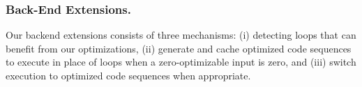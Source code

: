 

 
 
 \subsubsection{Back-End Extensions.}
 Our backend extensions consists of three mechanisms: (i) detecting loops that can benefit from our optimizations, (ii) generate and cache optimized code sequences to execute in place of loops when a zero-optimizable input is zero, and (iii) switch execution to optimized code  sequences when appropriate. 
 
